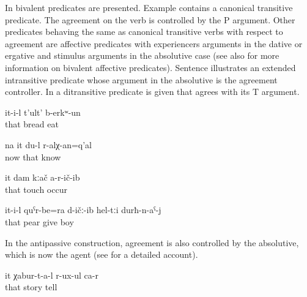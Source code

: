 In  bivalent predicates are presented. Example  contains a canonical transitive predicate. The agreement on the verb is controlled by the P argument. Other predicates behaving the same as canonical transitive verbs with respect to agreement are affective predicates with experiencers arguments in the dative or ergative and stimulus arguments in the absolutive case  (see also  for more information on bivalent affective predicates). Sentence  illustrates an extended intransitive predicate whose argument in the absolutive is the agreement controller. In  a ditransitive predicate is given that agrees with its T argument.
%
\begin{exe}
		\ex	\label{ex:S/he ate bread@13a}
		\gll	it-i-l	t'ult'	b-erkʷ-un\\
			that	bread	eat\\
		\glt	{}

		\ex	\label{ex:Well, I must know her}
		\gll	na	it	du-l	r-alχ-an=q'al\\	
			now	that		know\\
		\glt	{}

		\ex	\label{ex:She did not touch me@8a}
		\gll	it	dam	kːač a-r-ič-ib\\	
			that		touch occur\\
		\glt	{}

		\ex	\label{ex:He gave pears to the boys@8b}
		\gll	it-i-l	quˁr-be=ra	d-ičː-ib	hel-tːi	durħ-n-aˁ-j\\
			that	pear	give		boy\\
		\glt	{}
\end{exe}

In the antipassive construction, agreement is also controlled by the absolutive, which is now the agent  (see  for a detailed account).
%
\begin{exe}
	\ex	\label{ex:‎‎She is telling stories}
	\gll	it	χabur-t-a-l	r-ux-ul	ca-r\\
		that	story	tell	\\
	\glt	{}
\end{exe}

